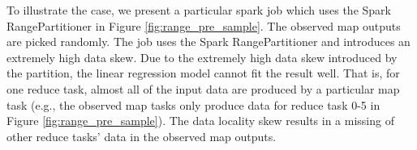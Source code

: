 {To illustrate the case, we present a particular spark job which uses the Spark RangePartitioner in Figure \ref{fig:range_pre_sample}. 
The observed map outputs are picked randomly. 
The job uses the Spark RangePartitioner and introduces an extremely high data skew.
Due to the extremely high data skew introduced by the partition, the linear regression model cannot fit the result well.
That is, for one reduce task, almost all of the input data are produced by a particular map task (e.g., the observed map tasks only produce data for reduce task 0-5 in Figure \ref{fig:range_pre_sample}).
The data locality skew results in a missing of other reduce tasks' data in the observed map outputs.

}
